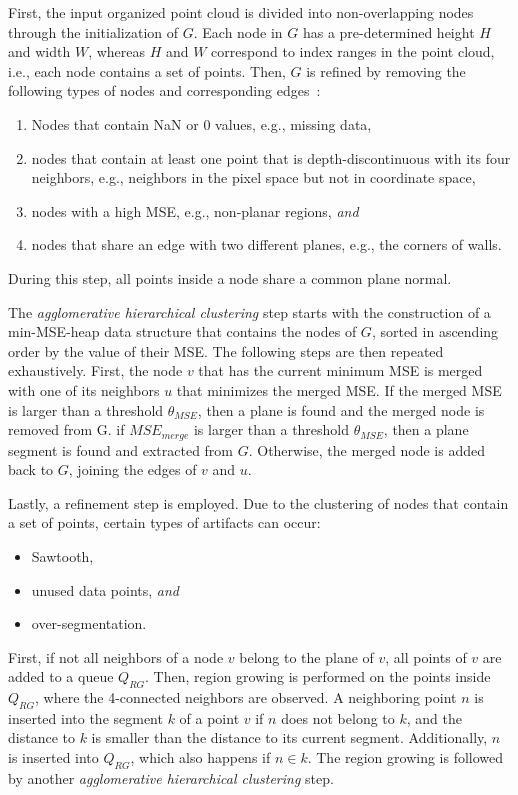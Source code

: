 \documentclass[main.tex]{subfiles}
\begin{document}
First, the input organized point cloud is divided into non-overlapping nodes through the initialization of $G$.
Each node in $G$ has a pre-determined height $H$ and width $W$, whereas $H$ and $W$ correspond to index ranges in the
point cloud, i.e., each node contains a set of points.
Then, $G$ is refined by removing the following types of nodes and corresponding edges~\cite[Section~III.A]{Feng_Taguchi_Kamat_2014}:
\begin{enumerate}
    \item Nodes that contain NaN or 0 values, e.g., missing data,
    \item nodes that contain at least one point that is depth-discontinuous with its four neighbors, e.g., neighbors
          in the pixel space but not in coordinate space,
    \item nodes with a high MSE, e.g., non-planar regions, \textit{and}
    \item nodes that share an edge with two different planes, e.g., the corners of walls.
\end{enumerate}
During this step, all points inside a node share a common plane normal.

The \textit{agglomerative hierarchical clustering} step starts with the construction of a min-MSE-heap data
structure that contains the nodes of $G$, sorted in ascending order by the value of their MSE.
The following steps are then repeated exhaustively.
First, the node $v$ that has the current minimum MSE is merged with one of its neighbors $u$ that minimizes the merged MSE.
If the merged MSE is larger than a threshold $\theta_{MSE}$, then a plane is found and the merged node is removed from G.
if $MSE_{merge}$ is larger than a threshold $\theta_{MSE}$, then a plane segment is found and extracted from $G$.
Otherwise, the merged node is added back to $G$, joining the edges of $v$ and $u$.

Lastly, a refinement step is employed. Due to the clustering of nodes that contain a set of points, certain types of
artifacts can occur:
\begin{itemize}
    \item Sawtooth,
    \item unused data points, \textit{and}
    \item over-segmentation.
\end{itemize}
First, if not all neighbors of a node $v$ belong to the plane of $v$, all points of $v$ are added to a queue $Q_{RG}$.
Then, region growing is performed on the points inside $Q_{RG}$, where the 4-connected neighbors are observed.
A neighboring point $n$ is inserted into the segment $k$ of a point $v$ if $n$ does not belong to $k$, and
the distance to $k$ is smaller than the distance to its current segment. Additionally, $n$ is inserted into $Q_{RG}$,
which also happens if $n \in k$.
The region growing is followed by another \textit{agglomerative hierarchical clustering} step.
\end{document}
